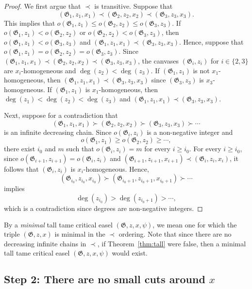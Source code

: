\documentclass{article}
\newcommand\g{\mathfrak{G}}
\begin{document}
\begin{proof}
We first argue that $\prec$ is transitive.  Suppose that 
$$(\g_1,z_1,x_1)\prec (\g_2,z_2,x_2)\prec(\g_3,z_3,x_3).$$
This implies that $o(\g_1,z_1)\le o(\g_2,z_2)\le o(\g_3,z_3)$.  If $o(\g_1,z_1)<o(\g_2,z_2)$ or $o(\g_2,z_2)<o(\g_3,z_3)$,
then $o(\g_1,z_1)<o(\g_3,z_3)$ and $(\g_1,z_1,x_1)\prec (\g_3,z_3,x_3)$.  Hence, suppose that $o(\g_1,z_1)=o(\g_2,z_2)=o(\g_3,z_3)$.
Since $(\g_1,z_1,x_1)\prec (\g_2,z_2,x_2)\prec(\g_3,z_3,x_3)$, the canvases $(\g_i,z_i)$ for $i\in\{2,3\}$ are $x_i$-homogeneous
and $\deg(z_2)<\deg(z_3)$.  If $(\g_1,z_1)$ is not $x_1$-homogeneous, then $(\g_1,z_1,x_1)\prec (\g_3,z_3,x_3)$ since $(\g_3,z_3)$ is $x_3$-homogeneous.
If $(\g_1,z_1)$ is $x_1$-homogeneous, then $\deg(z_1)<\deg(z_2)<\deg(z_3)$ and $(\g_1,z_1,x_1)\prec (\g_3,z_3,x_3)$.

Next, suppose for a contradiction that 
$$(\g_1,z_1,x_1)\succ (\g_2,z_2,x_2)\succ (\g_3,z_3,x_3) \succ \cdots$$
is an infinite decreasing chain.
Since $o(\g_i,z_i)$ is a non-negative integer and 
$$o(\g_1,z_1)\ge o(\g_2,z_2)\ge \cdots,$$ there exist $i_0$ and $m$ such that
$o(\g_i,z_i)=m$ for every $i\ge i_0$.  For every $i\ge i_0$, since $o(\g_{i+1},z_{i+1})=o(\g_i,z_i)$ and $(\g_{i+1},z_{i+1},x_{i+1})\prec (\g_i,z_i,x_i)$,
it follows that $(\g_i,z_i)$ is $x_i$-homogeneous.  Hence, 
$$(\g_{i_0},z_{i_0},x_{i_0})\succ (\g_{i_0+1},z_{i_0+1},x_{i_0+1})\succ \cdots$$ implies
$$\deg(z_{i_0}) > \deg(z_{i_0+1}) > \cdots,$$ which is a contradiction since degrees are non-negative integers.
\end{proof}


By a \textit{minimal} tall tame critical easel $(\g,z,x,\psi)$, we mean one for which the triple $(\g,z,x)$ is minimal in the $\prec$ ordering.  Note that since there are no decreasing infinite
chains in $\prec$, if Theorem~\ref{thm:tall} were false, then a minimal tall tame critical easel $(\g,z,x,\psi)$ would exist. 

\subsection{Step 2: There are no small cuts around $x$}
\end{document}
